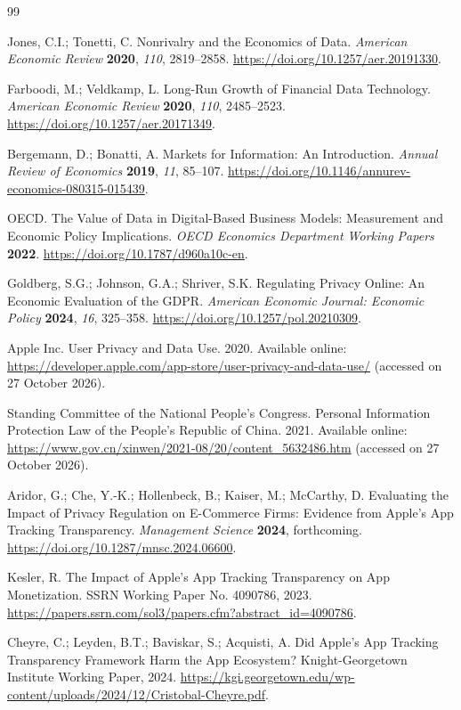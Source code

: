 \begin{thebibliography}{99}

Jones, C.I.; Tonetti, C. Nonrivalry and the Economics of Data. \textit{American Economic Review} \textbf{2020}, \textit{110}, 2819--2858. \url{https://doi.org/10.1257/aer.20191330}.

Farboodi, M.; Veldkamp, L. Long-Run Growth of Financial Data Technology. \textit{American Economic Review} \textbf{2020}, \textit{110}, 2485--2523. \url{https://doi.org/10.1257/aer.20171349}.

Bergemann, D.; Bonatti, A. Markets for Information: An Introduction. \textit{Annual Review of Economics} \textbf{2019}, \textit{11}, 85--107. \url{https://doi.org/10.1146/annurev-economics-080315-015439}.

OECD. The Value of Data in Digital-Based Business Models: Measurement and Economic Policy Implications. \textit{OECD Economics Department Working Papers} \textbf{2022}. \url{https://doi.org/10.1787/d960a10c-en}.

Goldberg, S.G.; Johnson, G.A.; Shriver, S.K. Regulating Privacy Online: An Economic Evaluation of the GDPR. \textit{American Economic Journal: Economic Policy} \textbf{2024}, \textit{16}, 325--358. \url{https://doi.org/10.1257/pol.20210309}.

Apple Inc. User Privacy and Data Use. 2020. Available online: \url{https://developer.apple.com/app-store/user-privacy-and-data-use/} (accessed on 27 October 2026).

Standing Committee of the National People's Congress. Personal Information Protection Law of the People's Republic of China. 2021. Available online: \url{https://www.gov.cn/xinwen/2021-08/20/content_5632486.htm} (accessed on 27 October 2026).

Aridor, G.; Che, Y.-K.; Hollenbeck, B.; Kaiser, M.; McCarthy, D. Evaluating the Impact of Privacy Regulation on E-Commerce Firms: Evidence from Apple's App Tracking Transparency. \textit{Management Science} \textbf{2024}, forthcoming. \url{https://doi.org/10.1287/mnsc.2024.06600}.

Kesler, R. The Impact of Apple's App Tracking Transparency on App Monetization. SSRN Working Paper No. 4090786, 2023. \url{https://papers.ssrn.com/sol3/papers.cfm?abstract_id=4090786}.

Cheyre, C.; Leyden, B.T.; Baviskar, S.; Acquisti, A. Did Apple's App Tracking Transparency Framework Harm the App Ecosystem? Knight-Georgetown Institute Working Paper, 2024. \url{https://kgi.georgetown.edu/wp-content/uploads/2024/12/Cristobal-Cheyre.pdf}.


\end{thebibliography}
